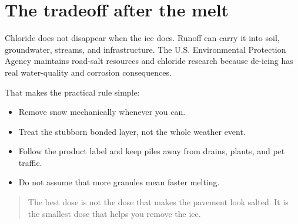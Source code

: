 \documentclass[11pt]{article}
\begin{document}
\section{The tradeoff after the melt}

Chloride does not disappear when the ice does. Runoff can carry it into soil, groundwater, streams, and infrastructure. The U.S. Environmental Protection Agency maintains road-salt resources and chloride research because de-icing has real water-quality and corrosion consequences.

That makes the practical rule simple:

\begin{itemize}
\item Remove snow mechanically whenever you can.
\item Treat the stubborn bonded layer, not the whole weather event.
\item Follow the product label and keep piles away from drains, plants, and pet traffic.
\item Do not assume that more granules mean faster melting.
\end{itemize}

\begin{quote}
The best dose is not the dose that makes the pavement look salted. It is the smallest dose that helps you remove the ice.
\end{quote}

\begin{sourcenotes}
\end{sourcenotes}

\begin{related}
\end{related}
\end{document}
